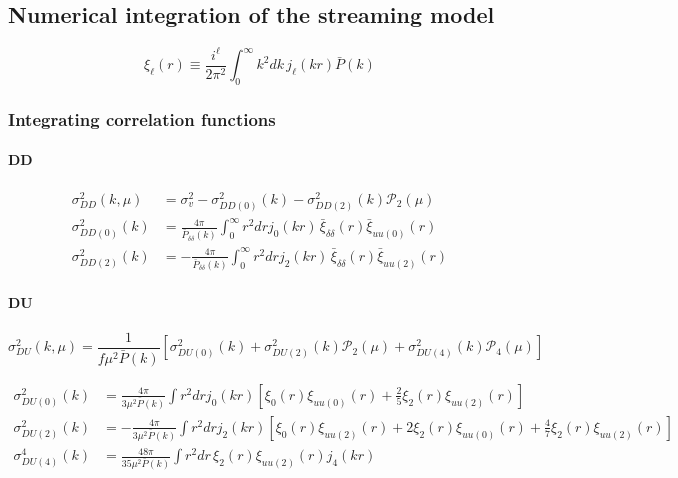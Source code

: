 \documentclass[a4paper,11pt, fleqn]{article}
\begin{document}
%
%
\clearpage
\subsection{Numerical integration of the streaming model}

\begin{equation}
  \xi_\ell(r) \equiv \frac{i^\ell}{2\pi^2}
  \int_0^\infty \! k^2 dk \, j_\ell(kr) \bar{P}(k)
\end{equation}

\subsubsection{Integrating correlation functions}

%
%
\paragraph{DD}

\begin{align}
  \sigma^2_{DD}(k, \mu) &=
  \sigma_v^2 - \sigma^2_{DD(0)}(k)
             - \sigma^2_{DD(2)}(k) \mathcal{P}_2(\mu)\\
%
  \sigma^2_{DD(0)}(k) &= 
  \frac{4\pi}{\bar{P}_{\delta\delta}(k)} \int_0^\infty \! r^2 dr
  j_0(kr)\,
  \bar{\xi}_{\delta\delta}(r)
  \bar{\xi}_{uu(0)}(r)\\
%
  \sigma^2_{DD(2)}(k) &=
  - \frac{4\pi}{\bar{P}_{\delta\delta}(k)} \int_0^\infty \! r^2 dr
  j_2(kr) \,\bar{\xi}_{\delta\delta}(r) \bar{\xi}_{uu(2)}(r)
\end{align}


%
%
\paragraph{DU}
%
\begin{equation}
  \sigma^2_{DU}(k, \mu) = \frac{1}{f\mu^2 \bar{P}(k)}
  \left[
    \sigma^2_{DU(0)}(k) + \sigma^2_{DU(2)}(k) \mathcal{P}_2(\mu)
    + \sigma^2_{DU(4)}(k) \mathcal{P}_4(\mu)
    \right]
\end{equation}


\begin{align}
  \sigma^2_{DU(0)}(k) &= \frac{4\pi}{3 \mu^2\bar{P}(k)}
    \int\! r^2 dr  j_0(kr) \left[
      \xi_0(r) \xi_{uu(0)}(r) + \frac{2}{5} \xi_2(r) \xi_{uu(2)}(r)
    \right]\\
  \sigma^2_{DU(2)}(k) &= -\frac{4\pi}{3 \mu^2 \bar{P}(k)}
  \int\! r^2 dr j_2(kr) \left[
    \xi_0(r) \xi_{uu(2)}(r) + 2 \xi_2(r) \xi_{uu(0)}(r) + \frac{4}{7} \xi_2(r) \xi_{uu(2)}(r)
    \right] \\
  \sigma^4_{DU(4)}(k) &= \frac{48\pi}{35 \mu^2 \bar{P}(k)} \int\! r^2 dr \,
  \xi_2(r) \xi_{uu(2)}(r) j_4(kr)    
\end{align}
\end{document}
